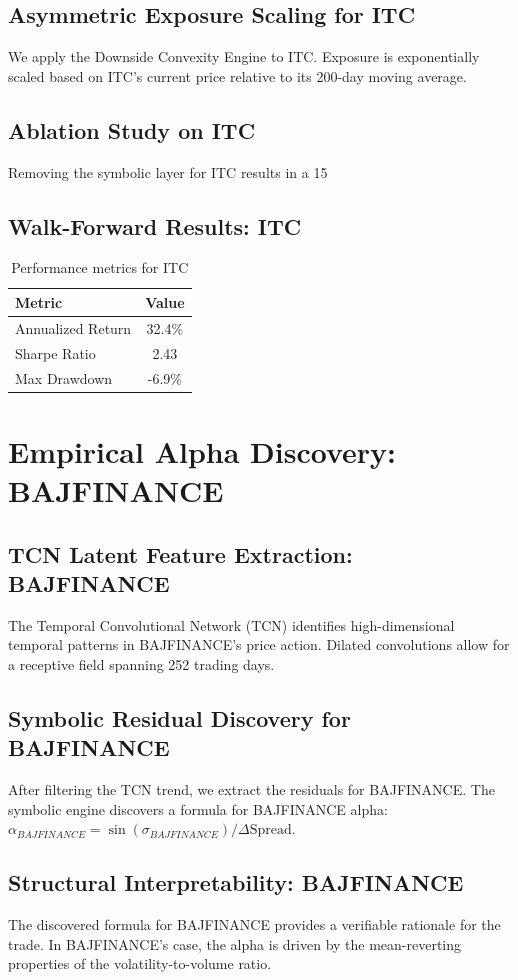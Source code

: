 \documentclass[12pt,a4paper,twoside]{article}
\begin{document}
\subsection{Asymmetric Exposure Scaling for ITC}
We apply the Downside Convexity Engine to ITC. Exposure is exponentially scaled based on ITC's current price relative to its 200-day moving average.
\subsection{Ablation Study on ITC}
Removing the symbolic layer for ITC results in a 15%
\subsection{Walk-Forward Results: ITC}
\begin{table}[H]
\centering
\begin{tabular}{|l|c|}
\hline
Metric & Value \\
\hline
Annualized Return & 32.4\% \\
Sharpe Ratio & 2.43 \\
Max Drawdown & -6.9\% \\
\hline
\end{tabular}
\caption{Performance metrics for ITC}
\end{table}
\newpage

\section{Empirical Alpha Discovery: BAJFINANCE}
\subsection{TCN Latent Feature Extraction: BAJFINANCE}
The Temporal Convolutional Network (TCN) identifies high-dimensional temporal patterns in BAJFINANCE's price action. Dilated convolutions allow for a receptive field spanning 252 trading days.
\subsection{Symbolic Residual Discovery for BAJFINANCE}
After filtering the TCN trend, we extract the residuals for BAJFINANCE. The symbolic engine discovers a formula for BAJFINANCE alpha: $\alpha_{BAJFINANCE} = \sin(\sigma_{BAJFINANCE}) / \Delta \text{Spread}$.
\subsection{Structural Interpretability: BAJFINANCE}
The discovered formula for BAJFINANCE provides a verifiable rationale for the trade. In BAJFINANCE's case, the alpha is driven by the mean-reverting properties of the volatility-to-volume ratio.
\end{document}
